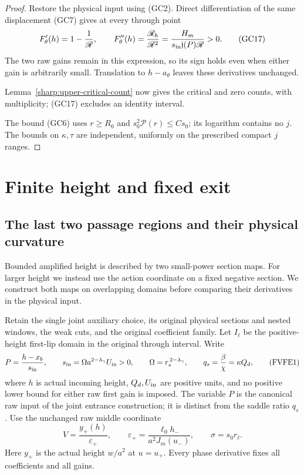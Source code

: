 \begin{proof}
Restore the physical input using (GC2). Direct differentiation of the
same displacement (GC7) gives at every through point
\[
 F_\theta'(h)=1-\frac1{\mathscr R},\qquad
 F_\theta''(h)=\frac{\mathscr R_h}{\mathscr R^2}
       =\frac{H_m}{s_{\rm in}\mathfrak j(P)\mathscr R}>0 .
 \tag{GC17}
\]
The two raw gains remain in this expression, so its sign holds even
when either gain is arbitrarily small.
Translation to $h-a_\theta$ leaves these derivatives unchanged.

Lemma~\ref{sharp:upper-critical-count} now gives the critical and
zero counts, with multiplicity; (GC17) excludes an identity interval.

The bound (GC6) uses $r\ge R_0$ and
$s_0^2\mathcal P(r)\le Cs_0$; its logarithm contains no $j$.
The bounds on $\kappa,\tau$ are independent, uniformly on the
prescribed compact $j$ ranges.
\end{proof}

\section{Finite height and fixed exit}
\subsection{The last two passage regions and their physical curvature}

Bounded amplified height is described by two small-power section maps.
For larger height we instead use the action coordinate on a fixed
negative section. We construct both maps on overlapping domains before
comparing their derivatives in the physical input.

Retain the single joint auxiliary choice, its original physical sections
and nested windows, the weak cuts, and the original coefficient family.
Let \(I_\ell\) be the positive-height first-lip domain in the original
through interval. Write
\[
 P={\frac{h-x_b}{s_{\rm in}}},\qquad
 s_{\rm in}=\Omega a^{2-\lambda_\gamma}U_{\rm in}>0,\qquad
 \Omega=r_s^{\,2-\lambda_\gamma},
 \qquad q_s={\frac{\beta}{\chi}}=\kappa Q_d ,
 \tag{FVFE1}
\]
where \(h\) is actual incoming height, \(Q_d,U_{\rm in}\) are positive
units, and no positive lower bound for either raw first gain is imposed.
The variable \(P\) is the canonical raw input of the joint entrance
construction; it is distinct from the saddle ratio \(q_s\).
Use the unchanged raw middle coordinate
\[
 V={\frac{y_+(h)}{\varepsilon_+}},\qquad
 \varepsilon_+={\frac{\ell_0h_-}{a^2J_m(u_-)}},\qquad
 \sigma=s_0r_\ell .
 \tag{FVFE2}
\]
Here \(y_+\) is the actual height \(w/a^2\) at \(u=u_+\).
Every phase derivative fixes all coefficients and all gains.

